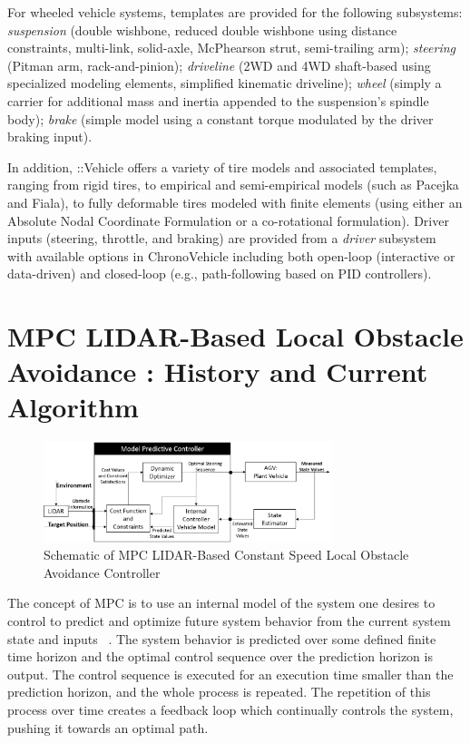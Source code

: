 \documentclass[12pt,onecolumn]{report}
\newcommand{\CHRONO}{{\sffamily{{Chrono}}}}
\newcommand{\ChronoVehicle}{{\sffamily{Chrono}}::Vehicle}
\begin{document}
For wheeled vehicle systems, templates are provided for the following subsystems:
{\em suspension} (double wishbone, reduced double wishbone using distance constraints, multi-link, solid-axle, McPhearson strut, semi-trailing arm);
{\em steering} (Pitman arm, rack-and-pinion);
{\em driveline} (2WD and 4WD shaft-based using specialized {\CHRONO} modeling elements, simplified kinematic driveline);
{\em wheel} (simply a carrier for additional mass and inertia appended to the suspension's spindle body);
{\em brake} (simple model using a constant torque modulated by the driver braking input).

In addition, {\ChronoVehicle} offers a variety of tire models and associated templates, ranging from rigid tires, to empirical and semi-empirical models (such as Pacejka and Fiala), to fully deformable tires modeled with finite elements (using either an Absolute Nodal Coordinate Formulation or a co-rotational formulation).  Driver inputs (steering, throttle, and braking) are provided from a {\em driver} subsystem with available options in {ChronoVehicle} including both open-loop (interactive or data-driven) and closed-loop (e.g., path-following based on PID controllers).


\section{MPC LIDAR-Based Local Obstacle Avoidance : History and Current Algorithm }\label{s:MPC}

\begin{figure}
	\centering
	\includegraphics[width=0.75\textwidth]{Figs/MPCBlockDiagram.png}
	\caption{{\small Schematic of MPC LIDAR-Based Constant Speed Local Obstacle Avoidance Controller}}    
	\label{fig:MPC_schematic}
\end{figure}

The concept of MPC is to use an internal model of the system one desires to control to predict and optimize future system behavior from the current system state and inputs ~\cite{Allgower&Findeisen2002}. The system behavior is predicted over some defined finite time horizon and the optimal control sequence over the prediction horizon is output. The control sequence is executed for an execution time smaller than the prediction horizon, and the whole process is repeated. The repetition of this process over time creates a feedback loop which continually controls the system, pushing it towards an optimal path.
\end{document}
